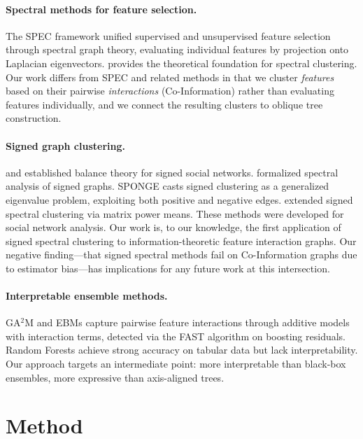 \documentclass[11pt,letterpaper]{article}
\begin{document}
\paragraph{Spectral methods for feature selection.} The SPEC framework \citep{Zhao2007} unified supervised and unsupervised feature selection through spectral graph theory, evaluating individual features by projection onto Laplacian eigenvectors. \citet{Luxburg2007} provides the theoretical foundation for spectral clustering. Our work differs from SPEC and related methods in that we cluster \emph{features} based on their pairwise \emph{interactions} (Co-Information) rather than evaluating features individually, and we connect the resulting clusters to oblique tree construction.

\paragraph{Signed graph clustering.} \citet{Heider1946} and \citet{Cartwright1956} established balance theory for signed social networks. \citet{Kunegis2010} formalized spectral analysis of signed graphs. SPONGE \citep{Cucuringu2019} casts signed clustering as a generalized eigenvalue problem, exploiting both positive and negative edges. \citet{Mercado2019} extended signed spectral clustering via matrix power means. These methods were developed for social network analysis. Our work is, to our knowledge, the first application of signed spectral clustering to information-theoretic feature interaction graphs. Our negative finding---that signed spectral methods fail on Co-Information graphs due to estimator bias---has implications for any future work at this intersection.

\paragraph{Interpretable ensemble methods.} GA$^2$M \citep{Lou2013} and EBMs \citep{Nori2019} capture pairwise feature interactions through additive models with interaction terms, detected via the FAST algorithm on boosting residuals. Random Forests \citep{Breiman2001} achieve strong accuracy on tabular data \citep{Grinsztajn2022} but lack interpretability. Our approach targets an intermediate point: more interpretable than black-box ensembles, more expressive than axis-aligned trees.

\section{Method}
\label{sec:method}
\end{document}
